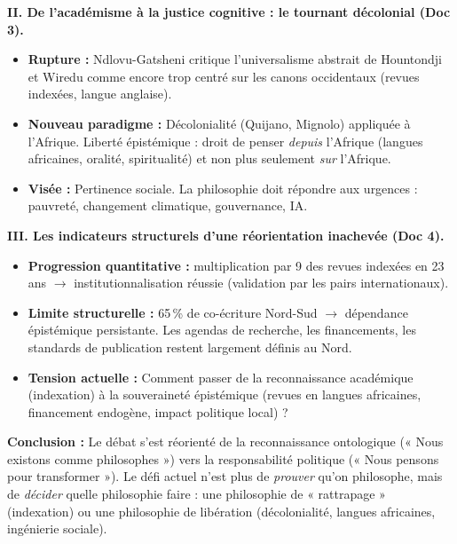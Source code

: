 \documentclass[11pt]{article}
\newcommand{\cle}[1]{{\popxbold\color{popdark}#1}}
\begin{document}
\begin{exoresolu}
\textbf{II. De l'académisme à la justice cognitive : le tournant décolonial (Doc 3).}
\begin{itemize}
    \item \textbf{Rupture :} Ndlovu-Gatsheni critique l'universalisme abstrait de Hountondji et Wiredu comme encore trop centré sur les canons occidentaux (revues indexées, langue anglaise).
    \item \textbf{Nouveau paradigme :} \cle{Décolonialité} (Quijano, Mignolo) appliquée à l'Afrique. \cle{Liberté épistémique} : droit de penser \emph{depuis} l'Afrique (langues africaines, oralité, spiritualité) et non plus seulement \emph{sur} l'Afrique.
    \item \textbf{Visée :} \cle{Pertinence sociale}. La philosophie doit répondre aux urgences : pauvreté, changement climatique, gouvernance, IA.
\end{itemize}

\textbf{III. Les indicateurs structurels d'une réorientation inachevée (Doc 4).}
\begin{itemize}
    \item \textbf{Progression quantitative :} multiplication par 9 des revues indexées en 23 ans $\rightarrow$ \cle{institutionnalisation} réussie (validation par les pairs internationaux).
    \item \textbf{Limite structurelle :} 65\,\% de co-écriture Nord-Sud $\rightarrow$ \cle{dépendance épistémique} persistante. Les agendas de recherche, les financements, les standards de publication restent largement définis au Nord.
    \item \textbf{Tension actuelle :} Comment passer de la \cle{reconnaissance académique} (indexation) à la \cle{souveraineté épistémique} (revues en langues africaines, financement endogène, impact politique local) ?
\end{itemize}

\textbf{Conclusion :} Le débat s'est réorienté de la \cle{reconnaissance ontologique} (« Nous existons comme philosophes ») vers la \cle{responsabilité politique} (« Nous pensons pour transformer »). Le défi actuel n'est plus de \emph{prouver} qu'on philosophe, mais de \emph{décider} quelle philosophie faire : une philosophie de « rattrapage » (indexation) ou une philosophie de \cle{libération} (décolonialité, langues africaines, ingénierie sociale).
\end{exoresolu}
\end{document}
